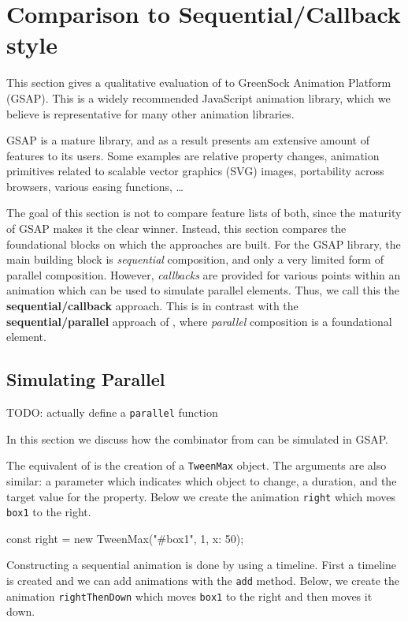 \section{Comparison to Sequential/Callback style}
\label{sec:evaluation}

This section gives a qualitative evaluation of \dsl{} to GreenSock Animation Platform (GSAP). This is a widely recommended JavaScript animation library, which we believe is representative for many other animation libraries.

GSAP is a mature library, and as a result presents am extensive amount of features to its users. Some examples are relative property changes, animation primitives related to scalable vector graphics (SVG) images, portability across browsers, various easing functions, \ldots

The goal of this section is not to compare feature lists of both, since the maturity of GSAP makes it the clear winner. Instead, this section compares the foundational blocks on which the approaches are built. For the GSAP library, the main building block is \emph{sequential} composition, and only a very limited form of parallel composition. However, \emph{callbacks} are provided for various points within an animation which can be used to simulate parallel elements. Thus, we call this the \textbf{sequential/callback} approach. This is in contrast with the \textbf{sequential/parallel} approach of \dsl{}, where \emph{parallel} composition is a foundational element.

\subsection{Simulating Parallel}

TODO: actually define a \texttt{parallel} function

In this section we discuss how the  combinator from \dsl{} can be simulated in GSAP.

The equivalent of  is the creation of a \texttt{TweenMax} object. The arguments are also similar:  a parameter which indicates which object to change, a duration, and the target value for the property. Below we create the animation \texttt{right} which moves \texttt{box1} to the right.

\begin{js}
const right = new TweenMax("#box1", 1, {x: 50});
\end{js}

Constructing a sequential animation is done by using a timeline. First a timeline is created and we can add animations with the \texttt{add} method. Below, we create the animation \texttt{rightThenDown} which moves \texttt{box1} to the right and then moves it down.

